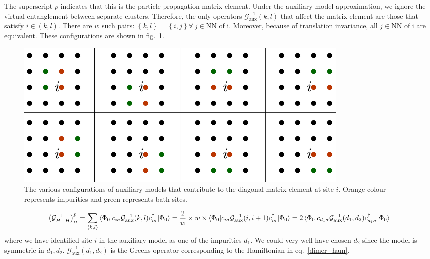 \documentclass{report}
\numberwithin{equation}{section}
\begin{document}
The superscript \(p\) indicates that this is the particle propagation matrix element. Under the auxiliary model approximation, we ignore the virtual entanglement between separate clusters. Therefore, the only operators \(\mathcal{G}^{-1}_\text{aux}(k,l)\) that affect the matrix element are those that satisfy \(i \in \left(k,l\right)\). There are \(w\) such pairs: \(\left\{k,l\right\} = \left\{i,j\right\} \forall~ j \in \text{NN of i}\). Moreover, because of translation invariance, all \(j \in \text{NN of i}\) are equivalent. These configurations are shown in fig.~\ref{diag_conrib}.
\begin{figure}[!htb]
	\centering
	\includegraphics[width=0.8\textwidth]{../figures/diagonal_contributors.pdf}
	\caption{The various configurations of auxiliary models that contribute to the diagonal matrix element at site \(i\). Orange colour represents impurities and green represents bath sites.}
	\label{diag_conrib}
\end{figure}

\begin{equation}\begin{aligned}
	\left(\mathcal{G}^{-1}_{H-H}\right)^p_{ii} = \sum_{\left<k,l\right>} \braket{\Phi_0 | c_{i\sigma} \mathcal{G}^{-1}_\text{aux}(k,l) c^\dagger_{i\sigma} | \Phi_0} = \frac{2}{w} \times w \times \braket{\Phi_0 | c_{i\sigma} \mathcal{G}^{-1}_\text{aux}(i, i+1) c^\dagger_{i\sigma} | \Phi_0} = 2\braket{\Phi_0 | c_{d_1\sigma} \mathcal{G}^{-1}_\text{aux}(d_1,d_2) c^\dagger_{d_1\sigma} | \Phi_0}
\end{aligned}\end{equation}
where we have identified site \(i\) in the auxiliary model as one of the impurities \(d_1\). We could very well have chosen \(d_2\) since the model is symmetric in \(d_1,d_2\). \(\mathcal{G}^{-1}_\text{aux}(d_1,d_2)\) is the Greens operator corresponding to the Hamiltonian in eq.~\ref{dimer_ham}.
\end{document}
